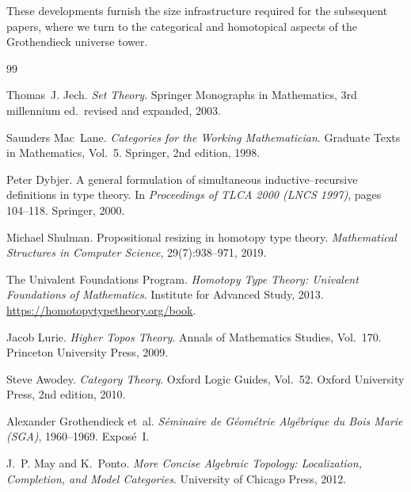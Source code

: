 \documentclass[a4paper,11pt]{article}
\begin{document}
\noindent
These developments furnish the size infrastructure required for the
subsequent papers, where we turn to the categorical and homotopical
aspects of the Grothendieck universe tower.
\newpage
\begin{thebibliography}{99}

Thomas~J. Jech.
\newblock \emph{Set Theory}.
\newblock Springer Monographs in Mathematics, 3rd millennium ed.\ revised and
  expanded, 2003.

Saunders Mac~Lane.
\newblock \emph{Categories for the Working Mathematician}.
\newblock Graduate Texts in Mathematics, Vol.~5. Springer, 2nd edition, 1998.

Peter Dybjer.
\newblock A general formulation of simultaneous inductive--recursive
  definitions in type theory.
\newblock In \emph{Proceedings of TLCA 2000 (LNCS 1997)}, pages 104--118.
  Springer, 2000.

Michael Shulman.
\newblock Propositional resizing in homotopy type theory.
\newblock \emph{Mathematical Structures in Computer Science}, 29(7):938--971,
  2019.

The Univalent Foundations Program.
\newblock \emph{Homotopy Type Theory: Univalent Foundations of Mathematics}.
\newblock Institute for Advanced Study, 2013.
\newblock \url{https://homotopytypetheory.org/book}.

Jacob Lurie.
\newblock \emph{Higher Topos Theory}.
\newblock Annals of Mathematics Studies, Vol.~170. Princeton University Press,
  2009.

Steve Awodey.
\newblock \emph{Category Theory}.
\newblock Oxford Logic Guides, Vol.~52. Oxford University Press, 2nd edition,
  2010.

Alexander Grothendieck et~al.
\newblock \emph{Séminaire de Géométrie Algébrique du Bois Marie (SGA)},
  1960--1969.
\newblock Exposé~I.

J.~P. May and K.~Ponto.
\newblock \emph{More Concise Algebraic Topology: Localization, Completion, and
  Model Categories}.
\newblock University of Chicago Press, 2012.

\end{thebibliography}
\end{document}
